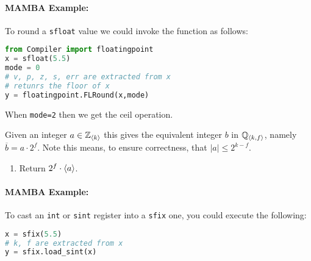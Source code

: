   \paragraph{MAMBA Example:} To round a \verb|sfloat| value we could invoke the function as follows:
  \begin{lstlisting}[language={python}]
from Compiler import floatingpoint
x = sfloat(5.5)
mode = 0
# v, p, z, s, err are extracted from x
# retunrs the floor of x
y = floatingpoint.FLRound(x,mode)
\end{lstlisting}
  When \verb+mode=2+ then we get the ceil operation.


  Given an integer $a \in {\mathbb{Z}}_{\langle k \rangle}$ this gives the equivalent integer $b$
  in ${\mathbb{Q}}_{\langle k, f \rangle}$, namely $\overline{b}=a \cdot 2^f$.
  Note this means, to ensure correctness, that $|a|\le 2^{k-f}$.
  \begin{enumerate}
    \item Return $2^f \cdot \langle a \rangle$.
  \end{enumerate}

  \paragraph{MAMBA Example:} To cast an \verb|int| or \verb|sint| register into a \verb|sfix| one, you could execute the following:
  \begin{lstlisting}[language={python}]
x = sfix(5.5)
# k, f are extracted from x
y = sfix.load_sint(x)
\end{lstlisting}

